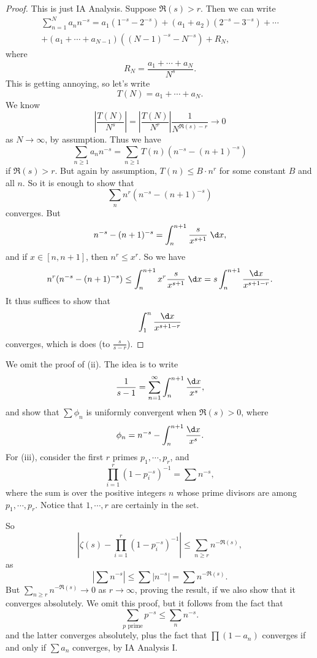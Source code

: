 \documentclass[a4paper]{article}
\begin{document}
\begin{proof}
  This is just IA Analysis. Suppose $\Re(s) > r$. Then we can write
  \begin{multline*}
    \sum_{n = 1}^N a_n n^{-s} = a_1 (1^{-s} - 2^{-s}) + (a_1 + a_2)(2^{-s} - 3^{-s}) + \cdots\\ + (a_1 + \cdots + a_{N - 1})((N - 1)^{-s} - N^{-s}) + R_N,
  \end{multline*}
  where
  \[
    R_N = \frac{a_1 + \cdots + a_N}{N^s}.
  \]
  This is getting annoying, so let's write
  \[
    T(N) = a_1 + \cdots + a_N.
  \]
  We know
  \[
    \left|\frac{T(N)}{N^s}\right| = \left|\frac{T(N)}{N^r}\right| \frac{1}{N^{\Re(s) - r}} \to 0
  \]
  as $N \to \infty$, by assumption. Thus we have
  \[
    \sum_{n \geq 1} a_n n^{-s} = \sum_{n \geq 1} T(n) (n^{-s} - (n + 1)^{-s})
  \]
  if $\Re(s) > r$. But again by assumption, $T(n) \leq B \cdot n^r$ for some constant $B$ and all $n$. So it is enough to show that
  \[
    \sum_n n^r (n^{-s} - (n + 1)^{-s})
  \]
  converges. But
  \[
    n^{-s} - (n + 1)^{-s} = \int_n^{n + 1} \frac{s}{x^{s + 1}}\;\d x,
  \]
  and if $x \in [n, n + 1]$, then $n^r \leq x^r$. So we have
  \[
    n^r (n^{-s} - (n + 1)^{-s}) \leq \int_n^{n + 1} x^r \frac{s}{x^{s + 1}} \;\d x = s \int_n^{n + 1} \frac{\d x}{x^{s + 1 - r}}.
  \]
  It thus suffices to show that
  \[
    \int_1^n \frac{\d x}{x^{s + 1 - r}}
  \]
  converges, which is does (to $\frac{s}{s - r}$).
\end{proof}

We omit the proof of (ii). The idea is to write
\[
  \frac{1}{s - 1} = \sum_{n = 1}^\infty \int_n^{n + 1} \frac{\d x}{x^s},
\]
and show that $\sum \phi_n$ is uniformly convergent when $\Re(s) > 0$, where
\[
  \phi_n = n^{-s} - \int_n^{n + 1} \frac{\d x}{x^s}.
\]
For (iii), consider the first $r$ primes $p_1, \cdots, p_r$, and
\[
  \prod_{i = 1}^r (1 - p_i^{-s})^{-1} = \sum n^{-s},
\]
where the sum is over the positive integers $n$ whose prime divisors are among $p_1, \cdots, p_r$. Notice that $1, \cdots, r$ are certainly in the set.

So
\[
  \left|\zeta(s) - \prod_{i = 1}^r (1 - p_i^{-s})^{-1}\right| \leq \sum_{n \geq r} n^{-\Re(s)},
\]
as
\[
  \left|\sum n^{-s}\right| \leq \sum |n^{-s}| = \sum n^{-\Re(s)}.
\]
But $\sum_{n \geq r} n^{-\Re(s)} \to 0$ as $r \to \infty$, proving the result, if we also show that it converges absolutely. We omit this proof, but it follows from the fact that
\[
  \sum_{p \text{ prime}} p^{-s} \leq \sum_n n^{-s}.
\]
and the latter converges absolutely, plus the fact that $\prod (1 - a_n)$ converges if and only if $\sum a_n$ converges, by IA Analysis I.
\end{document}
